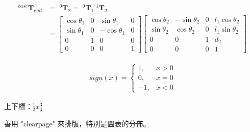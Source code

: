 \documentclass[12pt,a4paper,oneside]{book}
\begin{document}
\vspace{1.5cm}

\begin{align}
^{base}\mathbf{T}_{end} &= \; ^0\mathbf{T}_2 = \; ^0\mathbf{T}_1 \; ^1\mathbf{T}_2 \\
&=
\begin{bmatrix}
\cos \theta_1&0&\sin \theta_1&0\\
\sin \theta_1&0&-\cos \theta_1&0\\
0&1&0&0\\
0&0&0&1
\end{bmatrix}
\begin{bmatrix}
\cos \theta_2&-\sin \theta_2&0&l_1\cos \theta_2\\
\sin \theta_2&\cos \theta_2&0&l_1\sin \theta_2\\
0&0&1&d_2\\
0&0&0&1
\end{bmatrix}
\end{align}

\begin{align}
sign(x) =
\left\{
    \begin{array}{rl}
    1, & x>0 \\
    0, & x=0 \\
    -1, & x<0
    \end{array}
\right.
\end{align}

\vspace{1.5cm}

上下標：$^1_2x^3_4$

\clearpage
善用 "clearpage" 來排版，特別是圖表的分佈。
\end{document}
